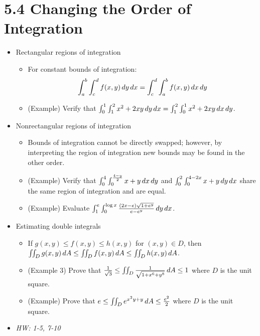 \documentclass[11pt]{article}
\begin{document}
\section*{5.4 Changing the Order of Integration}
\begin{itemize}
  \item Rectangular regions of integration
    \begin{itemize}
      \item For constant bounds of integration:
        \[
          \int_a^b\int_c^d f(x,y)\,d y\,d x
            =
          \int_c^d\int_a^b f(x,y)\,d x\,d y
        \]
      \item (Example) Verify that
        \(
          \int_0^1\int_1^2 x^2+2xy\,d y\,d x
            =
          \int_1^2\int_0^1 x^2+2xy\,d x\,d y
        \).
    \end{itemize}
  \item Nonrectangular regions of integration
    \begin{itemize}
      \item Bounds of integration cannot be directly swapped; however, by
      interpreting the region of integration new bounds may be found in
      the other order.
      \item (Example) Verify that
        \(
          \int_0^4\int_0^{\frac{4-y}{2}} x+y \,d x\,d y
        \)
      and
        \(
          \int_0^2\int_0^{4-2x} x+y \,d y\,d x
        \)
      share the same region of integration and are equal.
      \item (Example) Evaluate
        \(
          \int_1^e\int_0^{\log x}\frac{(2x-e)\sqrt{1+e^y}}{e-e^y}\,d y\,d x
        \). %
    \end{itemize}
  \item Estimating double integrals
    \begin{itemize}
      \item If \(g(x,y)\leq f(x,y)\leq h(x,y)\) for \((x,y)\in D\), then
      \(\iint_D g(x,y)\,d A\leq\iint_D f(x,y)\,d A\leq \iint_D h(x,y)\,d A\).
      \item (Example 3) Prove that
      \(\frac{1}{\sqrt 3}\leq \iint_D \frac{1}{\sqrt{1+x^6+y^8}}\,d A \leq 1\)
      where \(D\) is the unit square.
      \item (Example) Prove that
      \(e\leq\iint_D e^{x^2y+y}\,d A\leq \frac{e^2}{2}\)
      where \(D\) is the unit square.
    \end{itemize}
  \item\textit{
    HW: 1-5, 7-10
  }
\end{itemize}
\end{document}
